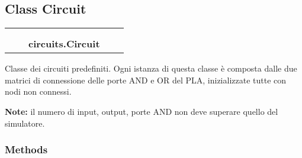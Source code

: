 
\subsection{Class Circuit}

    \label{circuits:Circuit}
\begin{tabular}{cccccc}
\multicolumn{2}{r}{\settowidth{\BCL}{object}\multirow{2}{\BCL}{object}}
&&
  \\\cline{3-3}
  &&\multicolumn{1}{c|}{}
&&
  \\
&&\multicolumn{2}{l}{\textbf{circuits.Circuit}}
\end{tabular}

Classe dei circuiti predefiniti. Ogni istanza di questa classe è composta 
dalle due matrici di connessione delle porte AND e OR del PLA, 
inizializzate tutte con nodi non connessi.

\textbf{Note:} il numero di input, output, porte AND non deve superare quello del 
simulatore.





  \subsubsection{Methods}

    \vspace{0.5ex}

